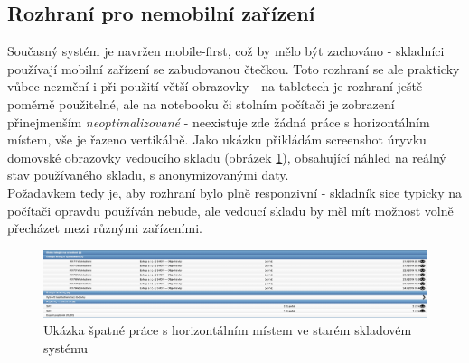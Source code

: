 \subsection{Rozhraní pro nemobilní zařízení}

Současný systém je navržen mobile-first, což by mělo být zachováno - skladníci používají mobilní zařízení se zabudovanou čtečkou. Toto rozhraní se ale prakticky vůbec nezmění i při použití větší obrazovky - na tabletech je rozhraní ještě poměrně použitelné, ale na notebooku či stolním počítači je zobrazení přinejmenším \emph{neoptimalizované} - neexistuje zde žádná práce s horizontálním místem, vše je řazeno vertikálně. Jako ukázku přikládám screenshot úryvku domovské obrazovky vedoucího skladu (obrázek \ref{picture:sysel:vertical}), obsahující náhled na reálný stav používaného skladu, s anonymizovanými daty.\\
Požadavkem tedy je, aby rozhraní bylo plně responzivní - skladník sice typicky na počítači opravdu používán nebude, ale vedoucí skladu by měl mít možnost volně přecházet mezi různými zařízeními.

\begin{figure}[]
\includegraphics[width=\textwidth]{../png/sysel/vertical.png}
\caption{Ukázka špatné práce s horizontálním místem ve starém skladovém systému} \label{picture:sysel:vertical}
\end{figure}
